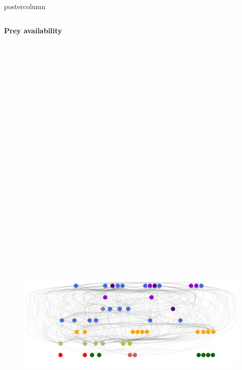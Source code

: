 \documentclass[final,hyperref={pdfpagelabels=false}]{beamer}
\begin{document}
\begin{frame}
\begin{columns}
\begin{column}{1\textwidth}
\begin{beamercolorbox}[center,wd=\textwidth]{postercolumn}
\begin{minipage}[T]{.98\textwidth}
{\begin{block}{}
\begin{columns}
\begin{column}{.85\textwidth}
            \centering \textbf{Prey availability}
              \begin{figure}
              \centering
              \includegraphics[height = 30cm]{images/food_web.jpeg}

\end{figure}
\end{column}
\end{columns}
\end{block}}
\end{minipage}
\end{beamercolorbox}
\end{column}
\end{columns}
\end{frame}
\end{document}
